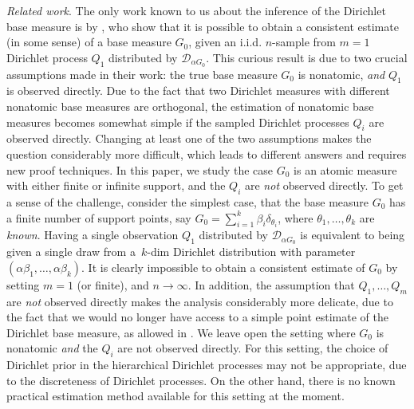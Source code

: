 \documentclass[MSNbibl,number,citesort]{arxbj}
\newcommand{\DP}{\mathscr{D}}
\begin{document}
\textit{Related work}.
The only work known to us about the inference of the Dirichlet
base measure is by \cite{Korwar-Hollander}, who show that it is
possible to obtain a
consistent estimate (in some sense) of a base measure $G_0$, given an
i.i.d. $n$-sample from $m=1$ Dirichlet process $Q_1$ distributed by
$\DP_{\alpha G_0}$. This curious result is due
to two crucial assumptions made in their work:
the true base measure $G_0$ is nonatomic, \emph{and} $Q_1$ is
observed directly. Due to the fact that two Dirichlet measures
with different nonatomic base measures are orthogonal,
the estimation of nonatomic base measures becomes somewhat
simple if the sampled Dirichlet processes $Q_i$ are observed
directly. Changing at least one of the two assumptions makes
the question considerably more difficult, which leads to
different answers and requires new proof techniques.
In this paper, we study the case $G_0$ is an atomic measure
with either finite or infinite support, and the $Q_i$ are
\emph{not} observed directly. To get a sense of the challenge, consider
the simplest case, that
the base measure $G_0$ has a finite number of support
points, say $G_0 = \sum_{i=1}^{k}\beta_i \delta_{\theta_i}$, where
$\theta_1,
\ldots,\theta_k$ are \emph{known}. Having a single observation
$Q_1$ distributed by $\DP_{\alpha G_0}$ is equivalent to being given a
single draw from
a~\mbox{$k$-dim} Dirichlet distribution with parameter
$(\alpha\beta_1,\ldots,\alpha\beta_k)$.
It is clearly impossible to obtain a consistent estimate
of $G_0$ by setting $m=1$ (or finite), and $n\rightarrow\infty$.
In addition, the assumption that $Q_1,\ldots,Q_m$ are \emph{not}
observed directly makes the analysis considerably more delicate, due to
the fact that we would no longer have access to a simple point estimate of
the Dirichlet base
measure, as allowed in \cite{Korwar-Hollander}. We leave
open the setting where $G_0$ is nonatomic \emph{and} the $Q_i$ are not
observed directly. For this setting, the choice of Dirichlet prior in
the hierarchical
Dirichlet processes may not be appropriate, due to the discreteness
of Dirichlet processes. On the other hand, there is no known
practical estimation method available for this setting at the moment.
\end{document}
